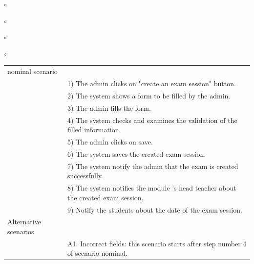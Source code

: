 \documentclass[]{uc2pfecaneva}
\begin{document}
\begin{list}{$\circ$}{}
\begin{list}{$\circ$}{}
\begin{list}{$\circ$}{}
\begin{list}{$\circ$}{}
\begin{table}[t]
\begin{tabularx}{\textwidth}{|l|X|}
            nominal scenario      &                                                                                                                                                                   \\
            & 1) The admin clicks on "create an exam session" button.                                                                                                           \\
            & 2) The system shows a form to be filled by the admin.                                                                                                             \\
            & 3) The admin fills the form.                                                                                                                                      \\
            & 4) The system checks and examines the validation of the filled information.                                                                                       \\
            & 5) The admin clicks on save.                                                                                                                                      \\
            & 6) The system saves the created exam session.                                                                                                                     \\
            & 7) The system notify the admin that the exam is created successfully.                                                                                             \\
            & 8) The system notifies the module 's head teacher about the created exam session.                                                                                 \\
            & 9) Notify the students about the date of the exam session.                                                                                                        \\ \hline
            Alternative scenarios &                                                                                                                                                                   \\
            & A1: Incorrect fields: this scenario starts after step number 4 of scenario nominal.                                                                               \\

\end{tabularx}
\end{table}
\end{list}
\end{list}
\end{list}
\end{list}
\end{document}
